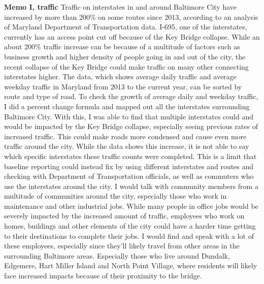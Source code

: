 \documentclass[
]{article}
\begin{document}
\textbf{Memo I, traffic} Traffic on interstates in and around Baltimore
City have increased by more than 200\% on some routes since 2013,
according to an analysis of Maryland Department of Transportation data.
I-695, one of the interstates, currently has an access point cut off
because of the Key Bridge collapse. While an about 200\% traffic
increase can be because of a multitude of factors such as business
growth and higher density of people going in and out of the city, the
recent collapse of the Key Bridge could make traffic on many other
connecting interstates higher. The data, which shows average daily
traffic and average weekday traffic in Maryland from 2013 to the current
year, can be sorted by route and type of road. To check the growth of
average daily and weekday traffic, I did a percent change formula and
mapped out all the interstates surrounding Baltimore City. With this, I
was able to find that multiple interstates could and would be impacted
by the Key Bridge collapse, especially seeing previous rates of
increased traffic. This could make roads more condensed and cause even
more traffic around the city. While the data shows this increase, it is
not able to say which specific interstates these traffic counts were
completed. This is a limit that baseline reporting could instead fix by
using different interstates and routes and checking with Department of
Transportation officials, as well as commuters who use the interstates
around the city. I would talk with community members from a multitude of
communities around the city, especially those who work in maintenance
and other industrial jobs. While many people in office jobs would be
severely impacted by the increased amount of traffic, employees who work
on homes, buildings and other elements of the city could have a harder
time getting to their destinations to complete their jobs. I would find
and speak with a lot of these employees, especially since they'll likely
travel from other areas in the surrounding Baltimore areas. Especially
those who live around Dundalk, Edgemere, Hart Miller Island and North
Point Village, where residents will likely face increased impacts
because of their proximity to the bridge.
\end{document}
